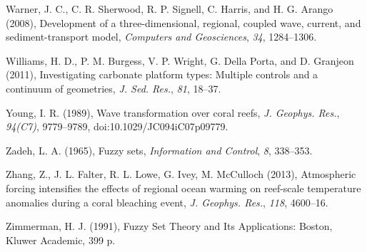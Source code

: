 \documentclass[default,jgrga]{agutex2015}
\begin{document}
\begin{article}
\begin{thebibliography}{}
Warner, J. C., C. R. Sherwood, R. P. Signell, C. Harris, and H. G. Arango (2008), Development of a three-dimensional, regional, coupled wave, current, and sediment-transport model, \textit{Computers and Geosciences}, \textit{34}, 1284--1306.

Williams, H. D., P. M. Burgess, V. P. Wright, G. Della Porta, and D. Granjeon (2011), Investigating carbonate platform types: Multiple controls and a continuum of geometries, \textit{J. Sed. Res.}, \textit{81}, 18--37.

Young, I. R. (1989), Wave transformation over coral reefs, \textit{J. Geophys. Res.}, \textit{94(C7)}, 9779--9789, doi:10.1029/JC094iC07p09779.

Zadeh, L. A. (1965), Fuzzy sets, \textit{Information and Control}, \textit{8}, 338--353.

Zhang, Z., J. L. Falter, R. L. Lowe, G. Ivey, M. McCulloch (2013), Atmospheric forcing intensifies the effects of regional ocean warming on reef-scale temperature anomalies during a coral bleaching event, \textit{J. Geophys. Res.}, \textit{118}, 4600–16.

Zimmerman, H. J. (1991), Fuzzy Set Theory and Its Applications: Boston, Kluwer Academic, 399 p.

%
%
%
%


\end{thebibliography}
\end{article}
\end{document}
